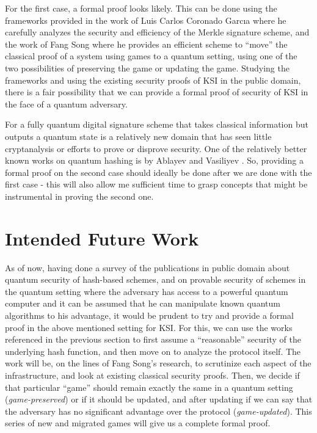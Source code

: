 \documentclass[10pt,a4paper]{article}
\begin{document}
For the first case, a formal proof looks likely. This can be done using the frameworks provided in the work of Luis Carlos Coronado Garcıa \cite{lui} where he carefully analyzes the security and efficiency of the Merkle signature scheme, and the work of Fang Song \cite{fan} where he provides an efficient scheme to ``move'' the classical proof of a system using games to a quantum setting, using one of the two possibilities of preserving the game or updating the game. Studying the frameworks and using the existing security proofs of KSI in the public domain, there is a fair possibility that we can provide a formal proof of security of KSI in the face of a quantum adversary.

For a fully quantum digital signature scheme that takes classical information but outputs a quantum state is a relatively new domain that has seen little cryptanalysis or efforts to prove or disprove security. One of the relatively better known works on quantum hashing is by Ablayev and Vasiliyev \cite{abl}. So, providing a formal proof on the second case should ideally be done after we are done with the first case - this will also allow me sufficient time to grasp concepts that might be instrumental in proving the second one.

\section{Intended Future Work}

As of now, having done a survey of the publications in public domain about quantum security of hash-based schemes, and on provable security of schemes in the quantum setting where the adversary has access to a powerful quantum computer and it can be assumed that he can manipulate known quantum algorithms to his advantage, it would be prudent to try and provide a formal proof in the above mentioned setting for KSI. For this, we can use the works referenced in the previous section to first assume a ``reasonable'' security of the underlying hash function, and then move on to analyze the protocol itself. The work will be, on the lines of Fang Song's research, to scrutinize each aspect of the infrastructure, and look at existing classical security proofs. Then, we decide if that particular ``game'' should remain exactly the same in a quantum setting (\textit{game-preserved}) or if it should be updated, and after updating if we can say that the adversary has no significant advantage over the protocol (\textit{game-updated}). This series of new and migrated games will give us a complete formal proof. 
\end{document}
